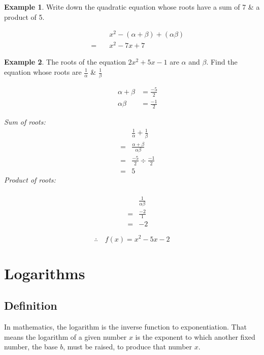 \documentclass[12pt, a4paper]{report}
\theoremstyle{definition}
\newtheorem{example}{Example}
\begin{document}
	\begin{example}
		Write down the quadratic equation whose roots have a sum of 7 \& a product of 5.
	\end{example}
	\begin{alignat*}{2}
		&   &        & x^{2} - (\alpha + \beta) + (\alpha\beta) \\
		&   & =\quad & x^2 - 7x + 7                             
	\end{alignat*}
	\hrulefill
	\begin{example}
		The roots of the equation $2x^2 + 5x -1$ are $\alpha$ and $\beta$. Find the equation whose roots are $\frac{1}{\alpha} $ \& $\frac{1}{\beta}$
	\end{example}
	\begin{alignat*}{2}
		&   & \alpha + \beta & = \frac{-5}{2} \\
		&   & \alpha\beta    & = \frac{-1}{2} 
	\end{alignat*}
	\newpage
	\begin{multicols}{2}
		\textit{Sum of roots:}
		\begin{alignat*}{2}
			&   &   & \frac{1}{\alpha} + \frac{1}{\beta} \\
			&   & = & \frac{\alpha+\beta}{\alpha\beta}   \\
			&   & = & \frac{-5}{2} \div \frac{-1}{2}     \\
			&   & = & 5                                  
		\end{alignat*}
		\textit{Product of roots:}
		
		\begin{alignat*}{2}
			\\&&&\frac{1}{\alpha\beta}\\
			&   & = & \frac{-2}{1} \\
			&   & = & -2           
		\end{alignat*}
	\end{multicols}
	\[ 
	\therefore \quad f(x) = x^2-5x-2
	\]
	\newpage
	\chapter{Logarithms}\label{sec:logarithms}
	\section{Definition}
	\quad In mathematics, the logarithm is the inverse function to exponentiation. That means the logarithm of a given number $x$ is the exponent to which another fixed number, the base $b$, must be raised, to produce that number $x$.\\
	
\end{document}
